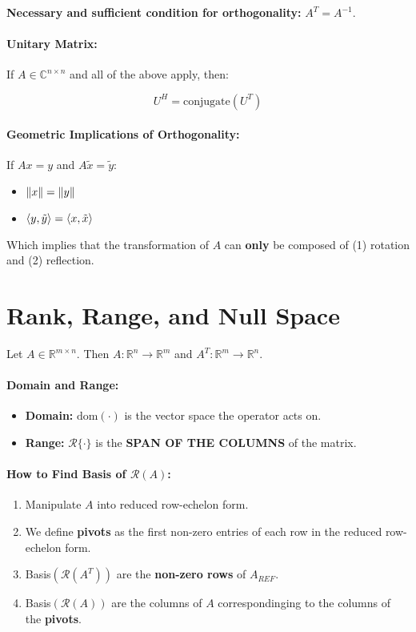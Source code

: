 \documentclass[a4paper,12pt]{report}
\DeclarePairedDelimiter\norm{\lVert}{\rVert}%
\DeclarePairedDelimiter\inpr{\langle}{\rangle}%
\def\reals{\mathbb{R}}
\begin{document}
\textbf{Necessary and sufficient condition for orthogonality: } $A^T = A^{-1}$.

\paragraph{Unitary Matrix: } If $A\in \mathbb{C}^{n\times n}$ and all of the above apply, then: 

$$U^H = \text{conjugate}(U^T)$$

\paragraph{Geometric Implications of Orthogonality: } 
If $Ax = y$ and $A\tilde{x} = \tilde{y}$: 
\begin{itemize}
\item $\norm{x} = \norm{y}$
\item $\inpr{y, \tilde{y}} = \inpr{x, \tilde{x}}$
\end{itemize}

Which implies that the transformation of $A$ can \textbf{only} be composed of (1) rotation and (2) reflection.

\section{Rank, Range, and Null Space}

Let $A\in \reals^{m\times n}$. Then $A:\reals^n \to \reals^m$ and $A^T: \reals^m \to \reals^n$.

\paragraph{Domain and Range: } 
\begin{itemize}
\item \textbf{Domain: } $\text{dom}(\cdot)$ is the vector space the operator acts on.
\item \textbf{Range: } $\mathcal{R}\{\cdot\}$ is the \textbf{SPAN OF THE COLUMNS} of the matrix.
\end{itemize}

\paragraph{How to Find Basis of $\mathcal{R}(A)$: }
\begin{enumerate}
\item Manipulate $A$ into reduced row-echelon form.
\item We define \textbf{pivots} as the first non-zero entries of each row in the reduced row-echelon form.
\item Basis$(\mathcal{R}(A^T))$ are the \textbf{non-zero rows} of $A_{REF}$.
\item Basis$(\mathcal{R}(A))$ are the columns of $A$ correspondinging to the columns of the \textbf{pivots}.
\end{enumerate}
\end{document}
